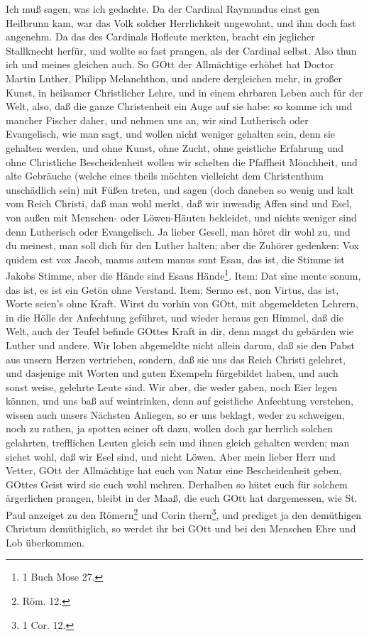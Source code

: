Ich muß sagen, was ich gedachte. Da der Cardinal Raymundus einst gen Heilbrunn kam, war das Volk solcher Herrlichkeit ungewohnt, und ihm doch fast angenehm. Da das des Cardinals Hofleute merkten, bracht ein jeglicher Stallknecht herfür, und wollte so fast prangen, als der Cardinal selbst. Also thun ich und meines gleichen auch. So GOtt der Allmächtige erhöhet hat Doctor Martin Luther, Philipp Melanchthon, und andere dergleichen mehr, in großer Kunst, in heilsamer Christlicher Lehre, und in einem ehrbaren Leben auch für der Welt, also, daß die ganze Christenheit ein Auge auf sie habe: so komme ich und mancher Fischer daher, und nehmen uns an, wir sind Lutherisch oder Evangelisch, wie man sagt, und wollen nicht weniger gehalten sein, denn sie gehalten werden, und ohne Kunst, ohne Zucht, ohne geistliche Erfahrung und ohne Christliche Bescheidenheit wollen wir schelten die Pfaffheit Mönchheit, und alte Gebräuche (welche eines theils möchten vielleicht dem Christenthum unschädlich sein) mit Füßen treten, und sagen
(doch daneben so wenig und kalt vom Reich Christi, daß man wohl merkt, daß wir inwendig Affen sind und Esel, von außen mit Menschen- oder Löwen-Häuten bekleidet, und nichts weniger sind denn Lutherisch oder Evangelisch. Ja lieber Gesell, man höret dir wohl zu, und du meinest, man soll dich für den Luther halten; aber die Zuhörer gedenken: Vox quidem est vox Jacob, manus autem manus sunt Esau, das ist, die Stimme ist Jakobs Stimme, aber die Hände sind Esaus Hände\footnote{1 Buch Mose 27.}. Item: Dat sine mente sonum, das ist, es ist ein Getön ohne Verstand. Item: Sermo est, non Virtus, das ist, Worte seien’s ohne Kraft. Wirst du vorhin von GOtt, mit abgemeldeten Lehrern, in die Hölle der Anfechtung geführet, und wieder heraus gen Himmel, daß die Welt, auch der Teufel befinde GOttes Kraft in dir, denn magst du gebärden wie Luther und andere. Wir loben abgemeldte nicht allein darum, daß sie den Pabst aus unsern Herzen vertrieben, sondern, daß sie uns das Reich Christi gelehret, und dasjenige mit Worten und guten Exempeln fürgebildet haben, und auch sonst weise, gelehrte Leute sind. Wir aber, die weder gaben, noch Eier legen können, und uns baß auf weintrinken, denn auf geistliche Anfechtung verstehen, wissen auch unsers Nächsten Anliegen, so er uns beklagt, weder zu schweigen, noch zu rathen, ja spotten seiner oft dazu, wollen doch gar herrlich solchen gelahrten, trefflichen Leuten gleich sein und ihnen gleich gehalten werden; man siehet wohl, daß wir Esel sind, und nicht Löwen. Aber mein lieber Herr und Vetter, GOtt der Allmächtige hat euch von Natur eine Bescheidenheit geben, GOttes Geist wird sie euch wohl mehren. Derhalben so hütet euch für solchem ärgerlichen prangen, bleibt in der Maaß, die euch GOtt hat dargemessen, wie St. Paul anzeiget zu den Römern\footnote{Röm. 12.} und Corin%
thern\footnote{1 Cor. 12.}, und prediget ja den demüthigen Christum demüthiglich, so werdet ihr bei GOtt und bei den Menschen Ehre und Lob überkommen.

